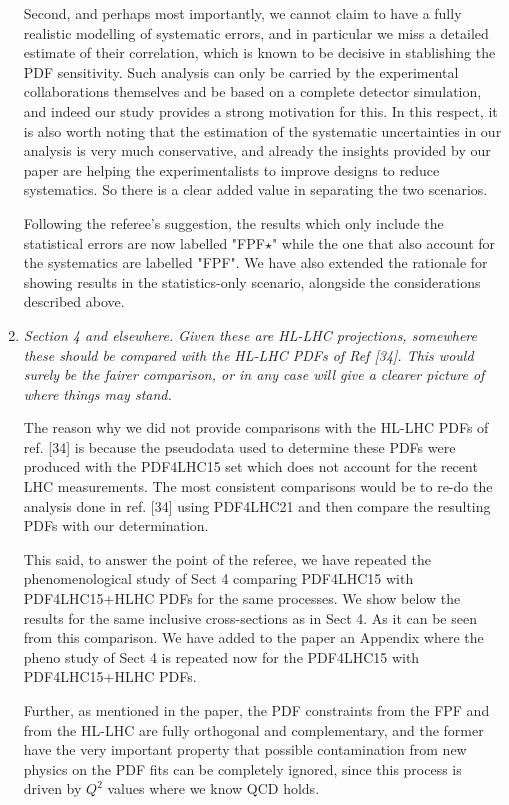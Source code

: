 \documentclass[11pt,a4paper]{article}
\begin{document}
\begin{enumerate}
        Second, and perhaps most importantly, we cannot claim to have a fully realistic modelling
        of systematic errors, and in particular we miss a detailed estimate of their correlation, which
        is known to be decisive in stablishing the PDF sensitivity.
        Such analysis can only be carried by the experimental collaborations themselves and
        be based on a complete detector simulation, and indeed our study provides
        a strong motivation for this.
        In this respect,  it is also worth noting that the estimation of the systematic uncertainties in our 
	analysis is very  much conservative, and already the insights provided by our paper
        are helping the experimentalists to improve designs to reduce systematics.
        So there is a clear added value in separating the two scenarios.
        	
	Following the referee's suggestion, the results which only include the statistical errors
	are now labelled "FPF$\star$" while the one that also account for the systematics are labelled "FPF".
        We have also extended the rationale for showing results in the statistics-only scenario, alongside the
        considerations described above.
	
	\item {\it Section 4 and elsewhere. Given these are HL-LHC projections, somewhere these should
		be compared with the HL-LHC PDFs of Ref [34]. This would surely be the fairer
		comparison, or in any case will give a clearer picture of where things may stand.
	}
	
	The reason why we did not provide comparisons with the HL-LHC PDFs of ref. [34] is because
	the pseudodata used to determine these PDFs were produced with the PDF4LHC15 set which
	does not account for the recent LHC measurements. The most consistent comparisons would
	be to re-do the analysis done in ref. [34] using PDF4LHC21 and then compare the resulting PDFs 
	with our determination.

        This said, to answer the point of the referee, we have repeated the phenomenological study of Sect 4
        comparing PDF4LHC15 with PDF4LHC15+HLHC PDFs for the same processes.
        We show below the results for the same inclusive cross-sections as in Sect 4.
        As it can be seen from this comparison.
        We have added to the paper an Appendix where the pheno study of Sect 4 is repeated
        now for the PDF4LHC15 with PDF4LHC15+HLHC PDFs.

        Further, as mentioned in the paper, the PDF constraints from the FPF and from the HL-LHC are
        fully orthogonal and complementary, and the former have the very important property that
        possible contamination from new physics on the PDF fits can be completely ignored, since
        this process is driven by $Q^2$ values where we know QCD holds.

\end{enumerate}
\end{document}
